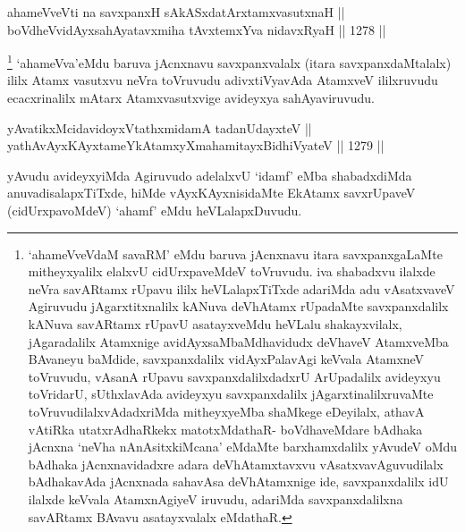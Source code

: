 
\begin{shl}
ahameVveVti na savxpanxH sAkASxdatArx\s \s tamxvasutxnaH || \\
boVdheV\s vidAyxsahAyatavxmiha tAvxtemxYva nidavxRyaH ||  1278 ||  
\end{shl}

\begin{artha}
\footnote{`ahameVveVdaM savaRM' eMdu baruva jAcnxnavu itara savxpanxgaLaMte mitheyxyalilx elalxvU cidUrxpaveMdeV toVruvudu. iva shabadxvu ilalxde neVra savARtamx rUpavu ililx heVLalapxTiTxde adariMda adu vAsatxvaveV Agiruvudu jAgarxtitxnalilx kANuva deVhAtamx rUpadaMte savxpanxdalilx kANuva savARtamx rUpavU asatayxveMdu heVLalu shakayxvilalx, jAgaradalilx Atamxnige avidAyxsaMbaMdhavidudx deVhaveV AtamxveMba BAvaneyu baMdide, savxpanxdalilx vidAyxPalavAgi keVvala AtamxneV toVruvudu, vAsanA rUpavu savxpanxdalilxdadxrU ArUpadalilx avideyxyu toVridarU, sUthxlavAda avideyxyu savxpanxdalilx jAgarxtinalilxruvaMte toVruvudilalxvAdadxriMda mitheyxyeMba shaMkege eDeyilalx, athavA vAtiRka utatxrAdhaRkekx matotxMdathaR- boVdhaveMdare bAdhaka jAcnxna `neVha nAnAsitxkiMcana' eMdaMte barxhamxdalilx yAvudeV oMdu bAdhaka jAcnxnavidadxre adara deVhAtamxtavxvu vAsatxvavAguvudilalx bAdhakavAda jAcnxnada sahavAsa deVhAtamxnige ide, savxpanxdalilx idU ilalxde keVvala AtamxnAgiyeV iruvudu, adariMda savxpanxdalilxna savARtamx BAvavu asatayxvalalx eMdathaR.} `ahameVva'eMdu baruva jAcnxnavu savxpanxvalalx (itara savxpanxdaMtalalx) ililx Atamx vasutxvu neVra toVruvudu adivxtiVyavAda AtamxveV ililxruvudu ecacxrinalilx mAtarx Atamxvasutxvige avideyxya sahAyaviruvudu.
\end{artha}


\begin{shl}
yAvatikxMcidavidoyxVtathxmidamA tadanUdayxteV || \\
yathAvAyxKAyxtameYkAtamxyXmahamitayxBidhiVyateV ||  1279 ||
\end{shl}

\begin{artha}
yAvudu avideyxyiMda Agiruvudo adelalxvU `idamf' eMba shabadxdiMda anuvadisalapxTiTxde, hiMde vAyxKAyxnisidaMte EkAtamx savxrUpaveV (cidUrxpavoMdeV) `ahamf' eMdu heVLalapxDuvudu.
\end{artha}


